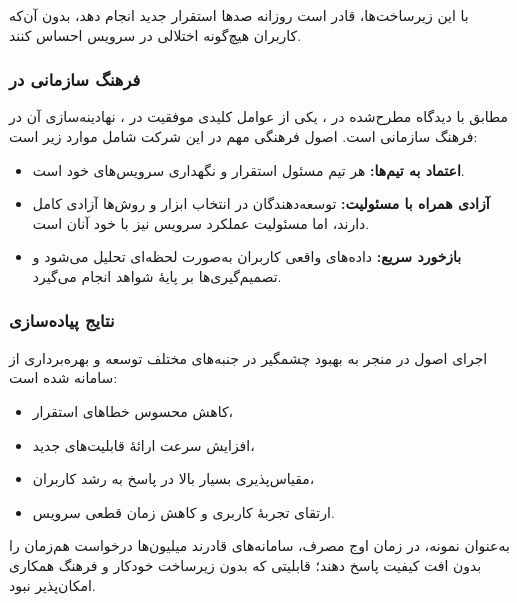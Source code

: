 با این زیرساخت‌ها،  قادر است روزانه صدها استقرار جدید انجام دهد، بدون آن‌که کاربران هیچ‌گونه اختلالی در سرویس احساس کنند.

\subsubsection*{فرهنگ سازمانی  در }

مطابق با دیدگاه مطرح‌شده در \cite{Jha2023}، یکی از عوامل کلیدی موفقیت  در ، نهادینه‌سازی آن در فرهنگ سازمانی است. اصول فرهنگی مهم در این شرکت شامل موارد زیر است:
\begin{itemize}
    \item \textbf{اعتماد به تیم‌ها:} هر تیم مسئول استقرار و نگهداری سرویس‌های خود است.
    \item \textbf{آزادی همراه با مسئولیت:} توسعه‌دهندگان در انتخاب ابزار و روش‌ها آزادی کامل دارند، اما مسئولیت عملکرد سرویس نیز با خود آنان است.
    \item \textbf{بازخورد سریع:} داده‌های واقعی کاربران به‌صورت لحظه‌ای تحلیل می‌شود و تصمیم‌گیری‌ها بر پایهٔ شواهد انجام می‌گیرد.
\end{itemize}

\subsubsection*{نتایج پیاده‌سازی}

اجرای اصول  در  منجر به بهبود چشمگیر در جنبه‌های مختلف توسعه و بهره‌برداری از سامانه شده است:
\begin{itemize}
    \item کاهش محسوس خطاهای استقرار،
    \item افزایش سرعت ارائهٔ قابلیت‌های جدید،
    \item مقیاس‌پذیری بسیار بالا در پاسخ به رشد کاربران،
    \item ارتقای تجربهٔ کاربری و کاهش زمان قطعی سرویس.
\end{itemize}

به‌عنوان نمونه، در زمان اوج مصرف، سامانه‌های  قادرند میلیون‌ها درخواست هم‌زمان را بدون افت کیفیت پاسخ دهند؛ قابلیتی که بدون زیرساخت خودکار و فرهنگ همکاری  امکان‌پذیر نبود.
